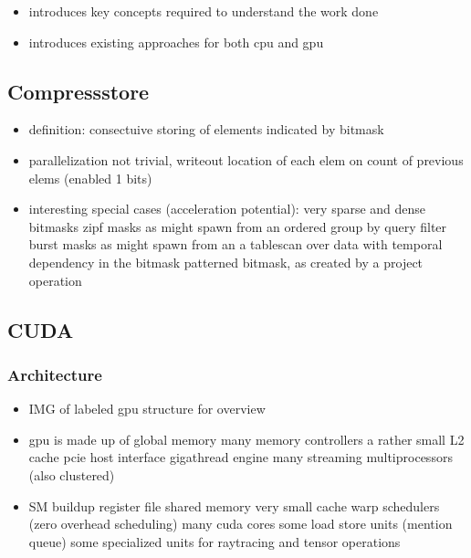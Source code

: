 \documentclass{tudscrartcl}
\begin{document}
		\begin{itemize}
			\item introduces key concepts required to understand the work done
			\item introduces existing approaches for both cpu and gpu
		\end{itemize}
	
		\subsection{Compressstore}
			\begin{itemize}
				\item definition: consectuive storing of elements indicated by bitmask
				\item parallelization not trivial, writeout location of each elem on count of previous elems (enabled 1 bits)
				\item interesting special cases (acceleration potential):
					\subitem very sparse and dense bitmasks
					\subitem zipf masks as might spawn from an ordered group by query filter
					\subitem burst masks as might spawn from an a tablescan over data with temporal dependency in the bitmask
					\subitem patterned bitmask, as created by a project operation
			\end{itemize}
		
		\subsection{CUDA}
		
			\subsubsection{Architecture}
				\begin{itemize}
					\item IMG of labeled gpu structure for overview
					\item gpu is made up of
						\subitem global memory
							\subsubitem many memory controllers
							\subsubitem a rather small L2 cache
						\subitem pcie host interface
						\subitem gigathread engine
						\subitem many streaming multiprocessors (also clustered)
					\item SM buildup
						\subitem register file
						\subitem shared memory
						\subitem very small cache
						\subitem warp schedulers (zero overhead scheduling)
						\subitem many cuda cores
						\subitem some load store units (mention queue)
						\subitem some specialized units for raytracing and tensor operations
				\end{itemize}
			
\end{document}
